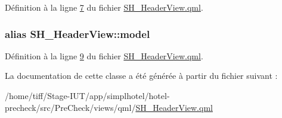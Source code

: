 Définition à la ligne \hyperlink{SH__HeaderView_8qml_source_l00007}{7} du fichier \hyperlink{SH__HeaderView_8qml_source}{S\-H\-\_\-\-Header\-View.\-qml}.

\hypertarget{classSH__HeaderView_abf76f87214384e86fb9413047287161d}{
\subsubsection[{model}]{\setlength{\rightskip}{0pt plus 5cm}alias S\-H\-\_\-\-Header\-View\-::model}}\label{classSH__HeaderView_abf76f87214384e86fb9413047287161d}


Définition à la ligne \hyperlink{SH__HeaderView_8qml_source_l00009}{9} du fichier \hyperlink{SH__HeaderView_8qml_source}{S\-H\-\_\-\-Header\-View.\-qml}.



La documentation de cette classe a été générée à partir du fichier suivant \-:\begin{DoxyCompactItemize}
\item 
/home/tiff/\-Stage-\/\-I\-U\-T/app/simplhotel/hotel-\/precheck/src/\-Pre\-Check/views/qml/\hyperlink{SH__HeaderView_8qml}{S\-H\-\_\-\-Header\-View.\-qml}\end{DoxyCompactItemize}
